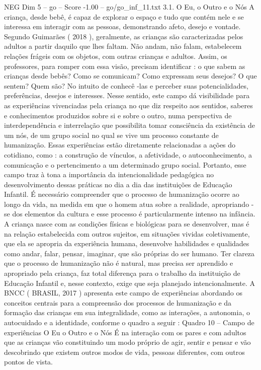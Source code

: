 \begin{textsample}{NEG Dim 5 – go – Score -1.00 – go/go\_inf\_11.txt}  \label{ex:f5_neg_271}
3.1.
O Eu, o Outro e o Nós A criança, desde bebê, é capaz de explorar o espaço e tudo que contém nele e se interessa em interagir com as pessoas, demonstrando afeto, desejo e vontade.
Segundo Guimarães ( 2018 ), geralmente, as crianças são caracterizadas pelos adultos a partir daquilo que lhes faltam.
Não andam, não falam, estabelecem relações frágeis com os objetos, com outras crianças e adultos.
Assim, os professores, para romper com essa visão, precisam identificar : o que sabem as crianças desde bebês?
Como se comunicam?
Como expressam seus desejos?
O que sentem?
Quem são?
No intuito de conhecê -las e perceber suas potencialidades, preferências, desejos e interesses.
Nesse sentido, este campo dá visibilidade para as experiências vivenciadas pela criança no que diz respeito aos sentidos, saberes e conhecimentos produzidos sobre si e sobre o outro, numa perspectiva de interdependência e interrelação que possibilita tomar consciência da existência de um nós, de um grupo social no qual se vive um processo constante de humanização.
Essas experiências estão diretamente relacionadas a ações do cotidiano, como : a construção de vínculos, a afetividade, o autoconhecimento, a comunicação e o pertencimento a um determinado grupo social.
Portanto, esse campo traz à tona a importância da intencionalidade pedagógica no desenvolvimento dessas práticas no dia a dia das instituições de Educação Infantil.
É necessário compreender que o processo de humanização ocorre ao longo da vida, na medida em que o homem atua sobre a realidade, apropriando -se dos elementos da cultura e esse processo é particularmente intenso na infância.
A criança nasce com as condições físicas e biológicas para se desenvolver, mas é na relação estabelecida com outros sujeitos, em situações vividas coletivamente, que ela se apropria da experiência humana, desenvolve habilidades e qualidades como andar, falar, pensar, imaginar, que são próprias do ser humano.
Ter clareza que o processo de humanização não é natural, mas precisa ser aprendido e apropriado pela criança, faz total diferença para o trabalho da instituição de Educação Infantil e, nesse contexto, exige que seja planejado intencionalmente.
A BNCC ( BRASIL, 2017 ) apresenta este campo de experiências abordando os conceitos centrais para a compreensão dos processos de humanização e da formação das crianças em sua integralidade, como as interações, a autonomia, o autocuidado e a identidade, conforme o quadro a seguir : Quadro 10 – Campo de experiências O Eu o Outro e o Nós É na interação com os pares e com adultos que as crianças vão constituindo um modo próprio de agir, sentir e pensar e vão descobrindo que existem outros modos de vida, pessoas diferentes, com outros pontos de vista.

\end{textsample}
